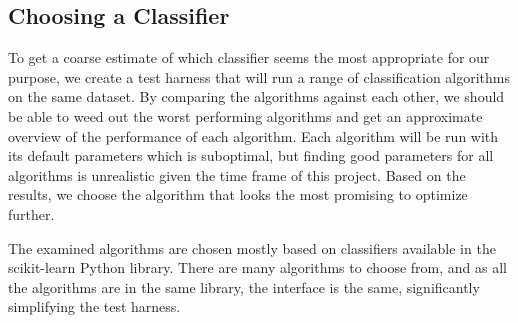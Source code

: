 



\subsection{Choosing a Classifier}\label{choosing_classifier}
To get a coarse estimate of which classifier seems the most appropriate for our purpose, we create a test harness that will run a range of classification algorithms on the same dataset. By comparing the algorithms against each other, we should be able to weed out the worst performing algorithms and get an approximate overview of the performance of each algorithm. Each algorithm will be run with its default parameters which is suboptimal, but finding good parameters for all algorithms is unrealistic given the time frame of this project. Based on the results, we choose the algorithm that looks the most promising to optimize further.

The examined algorithms are chosen mostly based on classifiers available in the scikit-learn Python library. There are many algorithms to choose from, and as all the algorithms are in the same library, the interface is the same, significantly simplifying the test harness.

